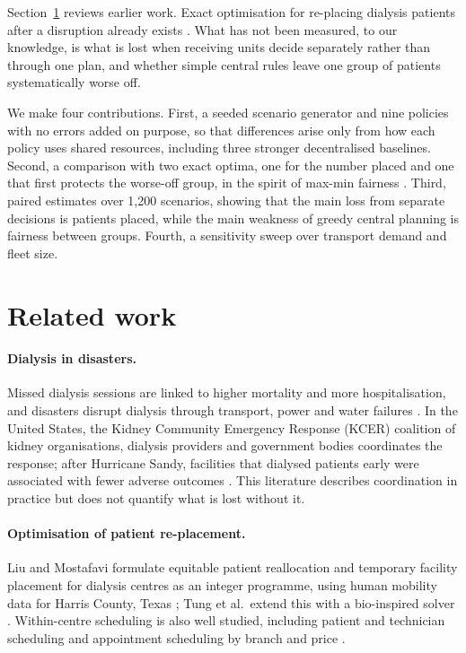 \documentclass[11pt,a4paper]{article}
\begin{document}
Section~\ref{sec:related} reviews earlier work. Exact optimisation for re-placing dialysis patients after a
disruption already exists \citep{liu2023equitable,tung2024critical}. What has not been measured, to our
knowledge, is what is lost when receiving units decide separately rather than through one plan, and whether
simple central rules leave one group of patients systematically worse off.

We make four contributions. First, a seeded scenario generator and nine policies with no errors added on
purpose, so that differences arise only from how each policy uses shared resources, including three stronger
decentralised baselines. Second, a comparison
with two exact optima, one for the number placed and one that first protects the worse-off group, in the
spirit of max-min fairness \citep{bertsimas2011price}. Third, paired estimates over 1,200 scenarios, showing
that the main loss from separate decisions is patients placed, while the main weakness of greedy central
planning is fairness between groups. Fourth, a sensitivity sweep over transport demand and fleet size.

\section{Related work}\label{sec:related}
\paragraph{Dialysis in disasters.} Missed dialysis sessions are linked to higher mortality and more
hospitalisation, and disasters disrupt dialysis through transport, power and water failures
\citep{smith2020disasters}. In the United States, the Kidney Community Emergency Response (KCER) coalition of
kidney organisations, dialysis providers and government bodies coordinates the response; after Hurricane
Sandy, facilities that dialysed patients early were associated with fewer adverse outcomes
\citep{kelman2015sandy}. This literature describes coordination in practice but does not quantify what is lost
without it.

\paragraph{Optimisation of patient re-placement.} Liu and Mostafavi formulate equitable patient reallocation
and temporary facility placement for dialysis centres as an integer programme, using human mobility data for
Harris County, Texas \citep{liu2023equitable}; Tung et al.\ extend this with a bio-inspired solver
\citep{tung2024critical}. Within-centre scheduling is also well studied, including patient and technician
scheduling \citep{farhadi2023dialysis} and appointment scheduling by branch and price
\citep{reihaneh2023dialysis}.
\end{document}

